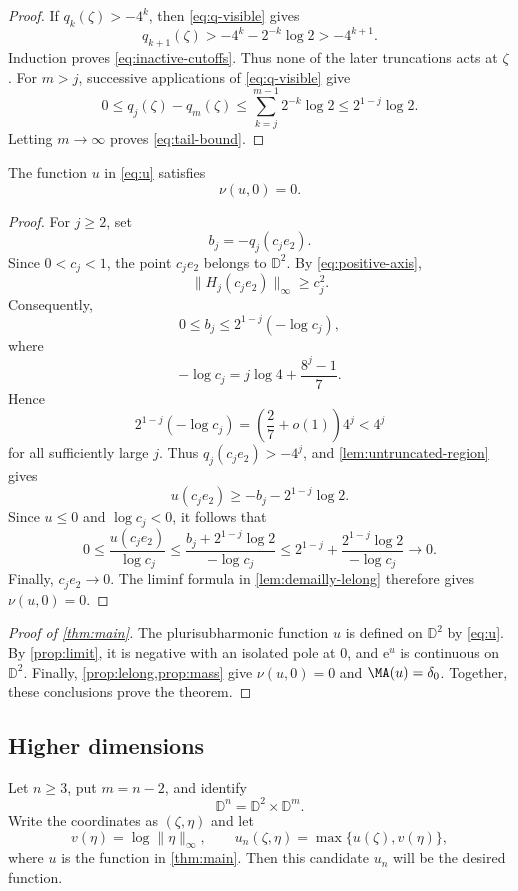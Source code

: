 \documentclass[11pt,a4paper]{article}
\newcommand{\e}{\mathrm e}
\begin{document}
\begin{proof}
If $q_k(\zeta)>-4^k$, then \eqref{eq:q-visible} gives
\[
  q_{k+1}(\zeta)
  >-4^k-2^{-k}\log 2
  >-4^{k+1}.
\]
Induction proves \eqref{eq:inactive-cutoffs}. Thus none of the later truncations acts at $\zeta$. For $m>j$, successive applications of \eqref{eq:q-visible} give
\[
  0\le q_j(\zeta)-q_m(\zeta)
  \le\sum_{k=j}^{m-1}2^{-k}\log 2
  \le2^{1-j}\log 2.
\]
Letting $m\to\infty$ proves \eqref{eq:tail-bound}.
\end{proof}

\begin{proposition}\label{prop:lelong}
The function $u$ in \eqref{eq:u} satisfies
\[
  \nu(u,0)=0.
\]
\end{proposition}

\begin{proof}
For $j\ge2$, set
\[
  b_j=-q_j(c_j e_2).
\]
Since $0<c_j<1$, the point $c_j e_2$ belongs to $\mathbb D^2$. By \eqref{eq:positive-axis},
\[
  \|H_j(c_j e_2)\|_\infty\ge c_j^2.
\]
Consequently,
\[
  0\le b_j\le2^{1-j}(-\log c_j),
\]
where
\[
  -\log c_j=j\log 4+\frac{8^j-1}{7}.
\]
Hence
\[
  2^{1-j}\left(-\log c_j\right)=\left(\frac{2}{7}+o(1)\right)4^j<4^j
\]
for all sufficiently large $j$. Thus $q_j(c_j e_2)>-4^j$, and \cref{lem:untruncated-region} gives
\[
  u(c_j e_2)\ge-b_j-2^{1-j}\log 2.
\]
Since $u\le0$ and $\log c_j<0$, it follows that
\[
  0\le\frac{u(c_j e_2)}{\log c_j}\le \frac{b_j+2^{1-j}\log 2}{-\log c_j}\le 2^{1-j}+\frac{2^{1-j}\log 2}{-\log c_j}\longrightarrow 0.
\]
Finally, $c_j e_2\to0$. The liminf formula in \cref{lem:demailly-lelong} therefore gives $\nu(u,0)=0$.
\end{proof}

\begin{proof}[Proof of \cref{thm:main}]
The plurisubharmonic function $u$ is defined on $\mathbb D^2$ by \eqref{eq:u}. By \cref{prop:limit}, it is negative with an isolated pole at $0$, and $\e^u$ is continuous on $\mathbb D^2$. Finally, \cref{prop:lelong,prop:mass} give $\nu(u,0)=0$ and $\MA(u)=\delta_0$. Together, these conclusions prove the theorem.
\end{proof}

\subsection{Higher dimensions}

Let $n\ge3$, put $m=n-2$, and identify
\[
  \mathbb D^n=\mathbb D^2\times\mathbb D^m.
\]
Write the coordinates as $(\zeta,\eta)$ and let
\[
  v(\eta)=\log\|\eta\|_\infty,
  \qquad
  u_n(\zeta,\eta)=\max\{u(\zeta),v(\eta)\},
\]
where $u$ is the function in \cref{thm:main}.
Then this candidate $u_n$ will be the desired function. 
\end{document}
